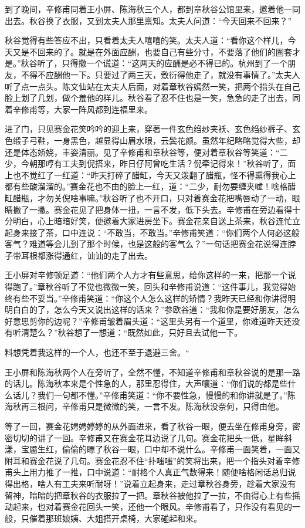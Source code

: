 \documentclass[12pt,UTF8]{ctexbook}
\begin{document}
{{{到了晚间，辛修甫同着王小屏、陈海秋三个人，都到章秋谷公馆里来，邀着他一同出去。秋谷换了衣服，又到太夫人那里禀知。太夫人问道：“今天回来不回来？”

秋谷觉得有些答应不出，只看着太夫人嘻嘻的笑。太夫人道：“看你这个样儿，今天又是不回来的了。就是在外面应酬，也要自己有些分寸，不要落了他们的圈套才是。”秋谷听了，只得撒一个谎道：“这两天的应酬是必不得已的。杭州到了一个朋友，不得不应酬他一下。只要过了两三天，敷衍得他走了，就没有事情了。”太夫人听了点一点头。陈文仙站在太夫人后面，对着章秋谷嫣然一笑，把两个指头在自己脸上划了几划，做个羞他的样儿。秋谷看了忍不住也是一笑，急急的走了出去，同着辛修甫等，大家一阵风都到连福里来。

进了门，只见赛金花笑吟吟的迎上来，穿著一件玄色绉纱夹袄、玄色绉纱裤子、玄色缎子弓鞋，一身黑色，越显得山眉水眼，云鬓花颜。虽然年纪略略觉得大些，却还是体态娇娆，丰姿清丽。见了辛修甫和章秋谷等，便对着章秋谷等笑道：“二少，今朝那哼有工夫到倪搭来，昨日仔阿曾吃生活？倪牵记得来！”秋谷听了，面上也不觉红了一红道：“昨天打碎了醋缸，今天又泼翻了醋瓶，怪不得熏得我心上都有些酸溜溜的。”赛金花也不由的脸上一红，道：“二少，耐勿要缠夹嘘！啥格醋缸醋瓶，才勿关倪啥事嘛。”秋谷听了也不开口，只对着赛金花把嘴唇动了一动，眼睛撇了一撇。赛金花见了把身体一扭，一言不发，低下头去。辛修甫在旁边看得十分明白，心上暗暗好笑，便邀着大家进房坐下。赛金花亲自送上茶来，秋谷连忙立起身来接了茶，口中连说：“不敢当，不敢当。”辛修甫笑道：“你们两个人何必这般客气？难道等会儿到了那个时候，也是这般的客气么？”一句话把赛金花说得连脖子带耳根都涨得通红，讪讪的走了出去。

王小屏对辛修顿足道：“他们两个人方才有些意思，给你这样的一来，把那一个说得跑了。”章秋谷听了不觉也微微一笑，回头和辛修甫说道：“这件事儿，我觉得始终有些不妥当。”辛修甫笑道：“你这个人怎么这样的矫情？我昨天已经和你讲得明明白白的了，怎么今天又说出这样的话来？”参欧谷道：“我和你是要好朋友，怎么好意思剪你的边呢？”辛修甫皱着眉头道：“这里头另有一个道里，你难道昨天还没有听清楚么？”秋谷想了一想道：“既然如此，只好且去试他一下。

料想凭着我这样的一个人，也还不至于退避三舍。“

王小屏和陈海秋两个人在旁听了，全然不懂，不知道辛修甫和章秋谷说的是那一路的话儿。陈海秋本来是个性急的人，那里忍得住，大声嚷道：“你们说的都是些什么话儿？我们一句都不懂。”辛修甫笑道：“你不要性急，慢慢的和你讲就是了。”陈海秋再三根问，辛修甫只是微微的笑，一言不发。陈海秋没奈何，只得由他。

等了一回，赛金花娉娉婷婷的从外面进来，看了秋谷一眼，便去坐在修甫身旁，密密切切的讲了一回。辛修甫又在赛金花耳边说了几句。赛金花把头一低，星眸斜漾，宝靥生红，偷偷的瞟了秋谷一眼，口中却不说什么。辛修甫一面笑着，一面又附耳和赛金花说了几句。赛金花忍不住“扑嗤嗤”的笑将出来，把一个指头对着辛修甫头上用力推了一推，口中说道：“耐格个人真正气数得来！随便啥格闲话总归说得出格，啥人有工夫来听耐呀！”说着立起身来，走过章秋谷身旁，趁着大家没有留神，暗暗的把章秋谷的衣服拉了一把。章秋谷被他拉了一拉，不由得心上有些摇动起来，也对着赛金花回头一笑，还他一个眼风。辛修甫看了，只作没有看见的一般，只催着那班娘姨、大姐搭开桌椅，大家碰起和来。

}}}
\end{document}
